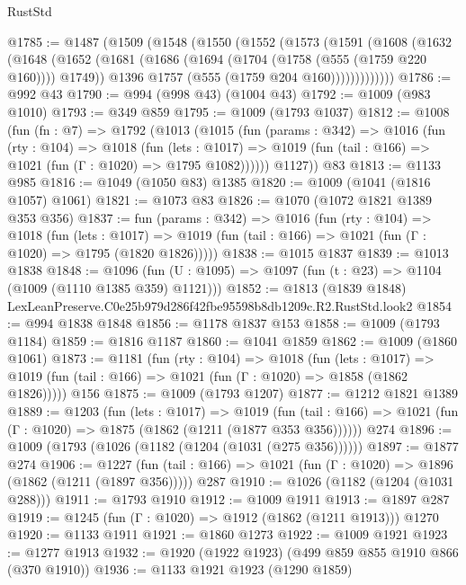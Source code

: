 \begin{lexlean}{RustStd}
\begin{coremodule}
@1785 := @1487
    (@1509
      (@1548
        (@1550
          (@1552
            (@1573
              (@1591
                (@1608
                  (@1632
                    (@1648
                      (@1652
                        (@1681
                          (@1686 (@1694 (@1704 (@1758 (@555 (@1759 @220 @160)))) @1749))
                          @1396
                          @1757
                          (@555 (@1759 @204 @160)))))))))))))
@1786 := @992 @43
@1790 := @994 (@998 @43) (@1004 @43)
@1792 := @1009 (@983 @1010)
@1793 := @349 @859
@1795 := @1009 (@1793 @1037)
@1812 := @1008
    (fun (fn : @7) =>
    @1792
      (@1013
        (@1015
          (fun (params : @342) =>
          @1016
            (fun (rty : @104) =>
            @1018
              (fun (lets : @1017) =>
              @1019 (fun (tail : @166) => @1021 (fun (Γ : @1020) => @1795 @1082))))))
        @1127))
    @83
@1813 := @1133 @985
@1816 := @1049 (@1050 @83) @1385
@1820 := @1009 (@1041 (@1816 @1057) @1061)
@1821 := @1073 @83
@1826 := @1070 (@1072 @1821 @1389 @353 @356)
@1837 := fun (params : @342) =>
  @1016
    (fun (rty : @104) =>
    @1018
      (fun (lets : @1017) =>
      @1019 (fun (tail : @166) => @1021 (fun (Γ : @1020) => @1795 (@1820 @1826)))))
@1838 := @1015 @1837
@1839 := @1013 @1838
@1848 := @1096 (fun (U : @1095) => @1097 (fun (t : @23) => @1104 (@1009 (@1110 @1385 @359) @1121)))
@1852 := @1813 (@1839 @1848) LexLeanPreserve.C0e25b979d286f42fbe95598b8db1209c.R2.RustStd.look2
@1854 := @994 @1838 @1848
@1856 := @1178 @1837 @153
@1858 := @1009 (@1793 @1184)
@1859 := @1816 @1187
@1860 := @1041 @1859
@1862 := @1009 (@1860 @1061)
@1873 := @1181
    (fun (rty : @104) =>
    @1018
      (fun (lets : @1017) =>
      @1019 (fun (tail : @166) => @1021 (fun (Γ : @1020) => @1858 (@1862 @1826)))))
    @156
@1875 := @1009 (@1793 @1207)
@1877 := @1212 @1821 @1389
@1889 := @1203
    (fun (lets : @1017) =>
    @1019 (fun (tail : @166) => @1021 (fun (Γ : @1020) => @1875 (@1862 (@1211 (@1877 @353 @356))))))
    @274
@1896 := @1009 (@1793 (@1026 (@1182 (@1204 (@1031 (@275 @356))))))
@1897 := @1877 @274
@1906 := @1227
    (fun (tail : @166) => @1021 (fun (Γ : @1020) => @1896 (@1862 (@1211 (@1897 @356)))))
    @287
@1910 := @1026 (@1182 (@1204 (@1031 @288)))
@1911 := @1793 @1910
@1912 := @1009 @1911
@1913 := @1897 @287
@1919 := @1245 (fun (Γ : @1020) => @1912 (@1862 (@1211 @1913))) @1270
@1920 := @1133 @1911
@1921 := @1860 @1273
@1922 := @1009 @1921
@1923 := @1277 @1913
@1932 := @1920 (@1922 @1923) (@499 @859 @855 @1910 @866 (@370 @1910))
@1936 := @1133 @1921 @1923 (@1290 @1859)

\end{coremodule}
\end{lexlean}
